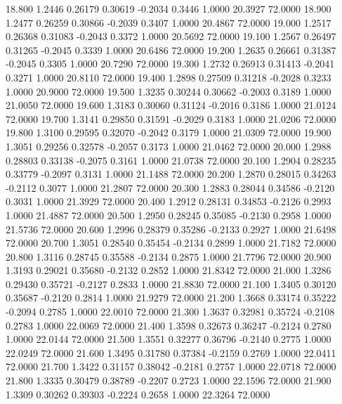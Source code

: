   18.800   1.2446   0.26179   0.30619  -0.2034   0.3446   1.0000  20.3927  72.0000
  18.900   1.2477   0.26259   0.30866  -0.2039   0.3407   1.0000  20.4867  72.0000
  19.000   1.2517   0.26368   0.31083  -0.2043   0.3372   1.0000  20.5692  72.0000
  19.100   1.2567   0.26497   0.31265  -0.2045   0.3339   1.0000  20.6486  72.0000
  19.200   1.2635   0.26661   0.31387  -0.2045   0.3305   1.0000  20.7290  72.0000
  19.300   1.2732   0.26913   0.31413  -0.2041   0.3271   1.0000  20.8110  72.0000
  19.400   1.2898   0.27509   0.31218  -0.2028   0.3233   1.0000  20.9000  72.0000
  19.500   1.3235   0.30244   0.30662  -0.2003   0.3189   1.0000  21.0050  72.0000
  19.600   1.3183   0.30060   0.31124  -0.2016   0.3186   1.0000  21.0124  72.0000
  19.700   1.3141   0.29850   0.31591  -0.2029   0.3183   1.0000  21.0206  72.0000
  19.800   1.3100   0.29595   0.32070  -0.2042   0.3179   1.0000  21.0309  72.0000
  19.900   1.3051   0.29256   0.32578  -0.2057   0.3173   1.0000  21.0462  72.0000
  20.000   1.2988   0.28803   0.33138  -0.2075   0.3161   1.0000  21.0738  72.0000
  20.100   1.2904   0.28235   0.33779  -0.2097   0.3131   1.0000  21.1488  72.0000
  20.200   1.2870   0.28015   0.34263  -0.2112   0.3077   1.0000  21.2807  72.0000
  20.300   1.2883   0.28044   0.34586  -0.2120   0.3031   1.0000  21.3929  72.0000
  20.400   1.2912   0.28131   0.34853  -0.2126   0.2993   1.0000  21.4887  72.0000
  20.500   1.2950   0.28245   0.35085  -0.2130   0.2958   1.0000  21.5736  72.0000
  20.600   1.2996   0.28379   0.35286  -0.2133   0.2927   1.0000  21.6498  72.0000
  20.700   1.3051   0.28540   0.35454  -0.2134   0.2899   1.0000  21.7182  72.0000
  20.800   1.3116   0.28745   0.35588  -0.2134   0.2875   1.0000  21.7796  72.0000
  20.900   1.3193   0.29021   0.35680  -0.2132   0.2852   1.0000  21.8342  72.0000
  21.000   1.3286   0.29430   0.35721  -0.2127   0.2833   1.0000  21.8830  72.0000
  21.100   1.3405   0.30120   0.35687  -0.2120   0.2814   1.0000  21.9279  72.0000
  21.200   1.3668   0.33174   0.35222  -0.2094   0.2785   1.0000  22.0010  72.0000
  21.300   1.3637   0.32981   0.35724  -0.2108   0.2783   1.0000  22.0069  72.0000
  21.400   1.3598   0.32673   0.36247  -0.2124   0.2780   1.0000  22.0144  72.0000
  21.500   1.3551   0.32277   0.36796  -0.2140   0.2775   1.0000  22.0249  72.0000
  21.600   1.3495   0.31780   0.37384  -0.2159   0.2769   1.0000  22.0411  72.0000
  21.700   1.3422   0.31157   0.38042  -0.2181   0.2757   1.0000  22.0718  72.0000
  21.800   1.3335   0.30479   0.38789  -0.2207   0.2723   1.0000  22.1596  72.0000
  21.900   1.3309   0.30262   0.39303  -0.2224   0.2658   1.0000  22.3264  72.0000
